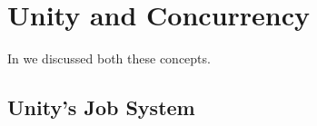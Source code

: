 \section{Unity and Concurrency}
In  we discussed both these concepts.

\subsection{Unity's Job System}

